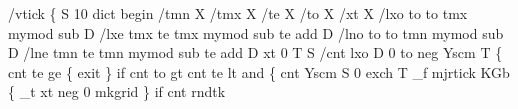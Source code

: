 \documentclass[11pt]{article}
\begin{document}
\nwenddocs{}\plusendmoddef
/vtick \{                 %
  S                      %
    10 dict begin        %
      /tmn X             %
      /tmx X             %
      /te X              %
      /to X              %
      /xt X              %
      /lxo               %
        to               %
        to tmx mymod     %
        sub              %
      D                  %
      /lxe               %
        tmx              %
        te tmx mymod     %
        sub              %
        te add           %
      D                  %
      /lno               %
        to               %
        to tmn mymod     %
        sub              %
      D                  %
      /lne               %
        tmn              %
        te tmn mymod     %
        sub              %
        te add           %
      D                  %
      xt 0 T             %
      S                  %
        /cnt             %
          lxo            %
        D                %
        0 to neg Yscm T  %
        \{                %
          cnt te ge \{    %
            exit         %
          \} if           %
          cnt to gt      %
          cnt te lt      %
          and \{          %
            cnt Yscm     %
            S            %
              0 exch T       %
              _f mjrtick     %
              KGb \{          %
                _t xt neg 0  %
                     mkgrid  %
              \} if           %
              cnt rndtk  %
\end{document}
